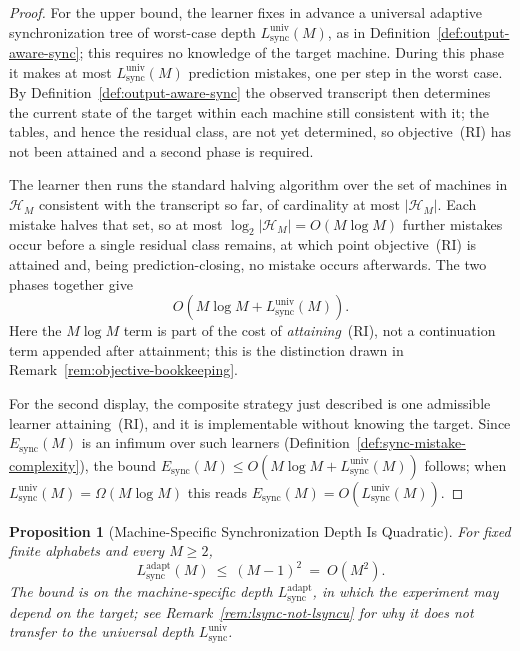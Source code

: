 \documentclass[12pt]{article}
\newtheorem{proposition}[theorem]{Proposition}
\theoremstyle{definition}
\newcommand{\Lsync}{L_{\mathrm{sync}}^{\mathrm{adapt}}}
\newcommand{\Lsyncu}{L_{\mathrm{sync}}^{\mathrm{univ}}}
\newcommand{\Esync}{E_{\mathrm{sync}}}
\begin{document}
\begin{proof}
For the upper bound, the learner fixes in advance a universal adaptive
synchronization tree of worst-case depth $\Lsyncu(M)$, as in
Definition~\ref{def:output-aware-sync}; this requires no knowledge of the
target machine.  During this phase it makes at most $\Lsyncu(M)$ prediction
mistakes, one per step in the worst case.  By
Definition~\ref{def:output-aware-sync} the observed transcript then determines
the current state of the target within each machine still consistent with it;
the tables, and hence the residual class, are not yet determined, so
objective~(RI) has not been attained and a second phase is required.

The learner then runs the standard halving algorithm over the set of machines
in $\mathcal H_M$ consistent with the transcript so far, of cardinality at
most $|\mathcal H_M|$.  Each mistake halves that set, so at most
$\log_2|\mathcal H_M|=O(M\log M)$ further mistakes occur before a single
residual class remains, at which point objective~(RI) is attained and, being
prediction-closing, no mistake occurs afterwards.  The two phases together
give
\[
O(M\log M+\Lsyncu(M)).
\]
Here the $M\log M$ term is part of the cost of \emph{attaining}~(RI), not a
continuation term appended after attainment; this is the distinction drawn in
Remark~\ref{rem:objective-bookkeeping}.

For the second display, the composite strategy just described is one
admissible learner attaining~(RI), and it is implementable without knowing the
target.  Since $\Esync(M)$ is an infimum over such learners
(Definition~\ref{def:sync-mistake-complexity}), the bound
$\Esync(M)\le O(M\log M+\Lsyncu(M))$ follows; when
$\Lsyncu(M)=\Omega(M\log M)$ this reads $\Esync(M)=O(\Lsyncu(M))$.

\end{proof}

\begin{proposition}[Machine-Specific Synchronization Depth Is Quadratic]
\label{prop:lsyncu-quadratic}
For fixed finite alphabets and every $M\ge2$,
\[
\Lsync(M)\ \le\ (M-1)^2\ =\ O(M^2).
\]
The bound is on the \emph{machine-specific} depth $\Lsync$, in which the
experiment may depend on the target; see
Remark~\ref{rem:lsync-not-lsyncu} for why it does not transfer to the
universal depth $\Lsyncu$.
\end{proposition}
\end{document}
